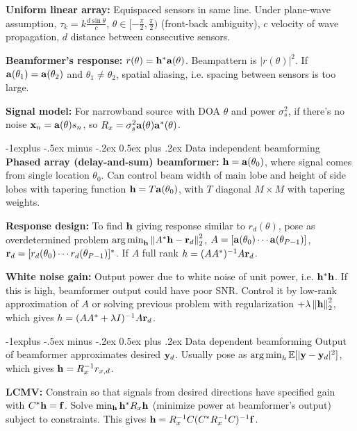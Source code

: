 \documentclass{article}
\makeatletter
\renewcommand{\subsection}{\@startsection{subsection}{2}{0mm}%
                                {-1explus -.5ex minus -.2ex}%
                                {0.5ex plus .2ex}%
                                {\color{red!50!yellow}\normalfont\small\bfseries}}
\makeatother
\begin{document}
\begin{multicols*}{3}
    \textbf{Uniform linear array: }Equispaced sensors in same line. Under plane-wave assumption, $\tau_k=k\frac{d\sin\theta}{c}$, $\theta\in[-\frac{\pi}{2},\frac{\pi}{2})$ (front-back ambiguity), $c$ velocity of wave propagation, $d$ distance between consecutive sensors.
    
    \textbf{Beamformer's response: }$r(\theta)=\hh^*\aa(\theta)$. Beampattern is $|r(\theta)|^2$. If $\aa(\theta_1)=\aa(\theta_2)$ and $\theta_1\neq \theta_2$, spatial aliasing, i.e. spacing between sensors is too large.
    
    \textbf{Signal model: }For narrowband source with DOA $\theta$ and power $\sigma_s^2$, if there's no noise $\xx_n=\aa(\theta)s_n$, so $R_x=\sigma_s^2\aa(\theta)\aa^*(\theta)$.
    
    \subsection{Data independent beamforming}
    \textbf{Phased array (delay-and-sum) beamformer: }$\hh=\aa(\theta_0)$, where signal comes from single location $\theta_0$. Can control beam width of main lobe and height of side lobes with tapering function $\hh=T\aa(\theta_0)$, with $T$ diagonal $M\times M$ with tapering weights.
    
    \textbf{Response design: }To find $\hh$ giving response similar to $r_d(\theta)$, pose as overdetermined problem $\argmin_{\hh}\norm{A^*\hh-\rr_d}_2^2$, $A=[\aa(\theta_0)\cdots \aa(\theta_{P-1})]$, $\rr_d=[r_d(\theta_0)\cdots r_d(\theta_{P-1})]^*$. If $A$ full rank $h=(AA^*)^{-1}A\rr_d$.
    
    \textbf{White noise gain: }Output power due to white noise of unit power, i.e. $\hh^*\hh$. If this is high, beamformer output could have poor SNR. Control it by low-rank approximation of $A$ or solving previous problem with regularization $+\lambda \norm{\hh}^2_2$, which gives $h=(AA^*+\lambda I)^{-1}A\rr_d$.
    
    \subsection{Data dependent beamforming}
    Output of beamformer approximates desired $\yy_d$. Usually pose as $\argmin_h\E[|\yy-\yy_d|^2]$, which gives $\hh=R_x^{-1}r_{x,d}$.
    
    \textbf{LCMV: }Constrain so that signals from desired directions have specified gain with $C^*\hh=\ff$. Solve $\min_{\hh}\hh^*R_x\hh$ (minimize power at beamformer's output) subject to constraints. This gives $\hh=R_x^{-1}C(C^*R_x^{-1}C)^{-1}\ff$.
    

\end{multicols*}
\end{document}
